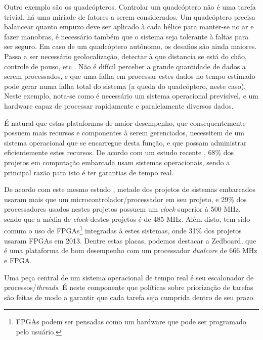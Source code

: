 Outro exemplo são os quadcópteros. Controlar um quadcóptero não é uma tarefa trivial, há uma miríade de fatores a serem considerados. Um quadcóptero precisa balancear quanto empuxo deve ser aplicado à cada hélice para manter-se no ar e fazer manobras, é necessário também que o sistema seja tolerante à faltas para ser seguro. Em caso de um quadcóptero autônomo, os desafios são ainda maiores. Passa a ser necessário geolocalização, detectar à que distancia se está do chão, controle de pouso, etc \cite{leeseshia}.
Não é difícil perceber a grande quantidade de dados a serem processados, e que uma falha em processar estes dados no tempo estimado pode gerar numa falha total do sistema (a queda do quadcóptero, neste caso). Neste exemplo, nota-se como é necessário um sistema operacional previsível, e um hardware capaz de processar rapidamente e paralelamente diversos dados.



É natural que estas plataformas de maior desempenho, que consequentemente possuem mais recursos e componentes à serem gerenciados, necessitem de um sistema operacional que se encarregue desta função, e que possam administrar eficientemente estes recursos.
De acordo com um estudo recente \cite{UBM}, 68\% dos projetos em computação embarcada usam sistemas operacionais, sendo a principal razão para isto é ter garantias de tempo real.

De acordo com este mesmo estudo \cite{UBM}, metade dos projetos de sistemas embarcados usaram mais que um microcontrolador/processador em seu projeto, e 29\% dos processadores usados nestes projetos possuem um \emph{clock} superior à 500 MHz, sendo que a média de \emph{clock} destes projetos é de 485 MHz.
Além disto, tem sido comum o uso de FPGAs\footnote{FPGAs podem ser pensadas como um hardware que pode ser programado pelo usuário.} integradas à estes sistemas, onde 31\% dos projetos usaram FPGAs em 2013.
Dentre estas placas, podemos destacar a Zedboard, que é uma plataforma de bom desempenho com um processador \emph{dualcore} de 666 MHz e FPGA.


Uma peça central de um sistema operacional de tempo real é seu escalonador de processos/\emph{threads}. É neste componente que políticas sobre priorização de tarefas são feitas de modo a garantir que cada tarefa seja cumprida dentro de seu prazo.


